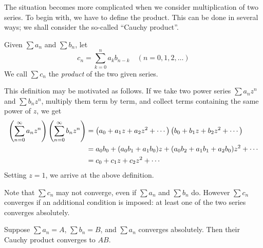 The situation becomes more complicated when we consider multiplication of two series. To begin with, we have to define the product. This can be done in several ways; we shall consider the so-called ``Cauchy product''. 

\begin{definition}
Given $\sum a_n$ and $\sum b_n$, let
\[c_n=\sum_{k=0}^{n}a_k b_{n-k}\quad(n=0,1,2,\dots)\]
We call $\sum c_n$ the \emph{product} of the two given series.
\end{definition}

This definition may be motivated as follows. If we take two power series $\sum a_nz^n$ and $\sum b_nz^n$, multiply them term by term, and collect terms containing the same power of $z$, we get
\begin{align*}
\left(\sum_{n=0}^{\infty}a_nz^n\right)\left(\sum_{n=0}^{\infty}b_nz^n\right)
&=\left(a_0+a_1z+a_2z^2+\cdots\right)\left(b_0+b_1z+b_2z^2+\cdots\right)\\
&=a_0b_0+(a_0b_1+a_1b_0)z+(a_0b_2+a_1b_1+a_2b_0)z^2+\cdots\\
&=c_0+c_1z+c_2z^2+\cdots
\end{align*}
Setting $z=1$, we arrive at the above definition.

Note that $\sum c_n$ may not converge, even if $\sum a_n$ and $\sum b_n$ do. However $\sum c_n$ converges if an additional condition is imposed: at least one of the two series converges absolutely.

\begin{proposition}
Suppose $\sum a_n=A$, $\sum b_n=B$, and $\sum a_n$ converges absolutely. Then their Cauchy product converges to $AB$.
\end{proposition}

